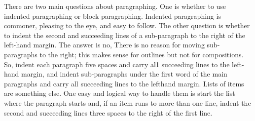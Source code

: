 \documentclass[
    oneside,
    11pt,
]{memoir}
\begin{document}
There are two main questions about paragraphing. One is whether to use indented paragraphing or block paragraphing. Indented paragraphing is commoner, pleasing to the eye, and easy to follow. The other question is whether to indent the second and succeeding lines of a sub-paragraph to the right of the left-hand margin. The answer is no, There is no reason for moving sub-paragraphs to the right; this makes sense for outlines but not for compositions. So, indent each paragraph five spaces and carry al1 succeeding lines to the left-hand margin, and indent sub-paragraphs under the first word of the main paragraphs and carry all succeeding lines to the lefthand margin. Lists of items are something else. One easy and logical way to handle them is start the list where the paragraph starts and, if an item runs to more than one line, indent the second and succeeding lines three spaces to the right of the first line.
\end{document}
